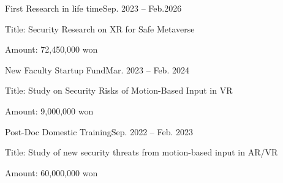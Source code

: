 \documentclass[11pt,letterpaper]{article}
\begin{document}
\begin{envtime}{First Research in life time}{Sep. 2023 -- Feb.2026}
	\item Title: Security Research on XR for Safe Metaverse
	\item Amount: 72,450,000 won
\end{envtime}
\begin{envtime}{New Faculty Startup Fund}{Mar. 2023 -- Feb. 2024}
	\item Title: Study on Security Risks of Motion-Based Input in VR
	\item Amount: 9,000,000 won
\end{envtime}
\begin{envtime}{Post-Doc Domestic Training}{Sep. 2022 -- Feb. 2023}
	\item Title: Study of new security threats from motion-based input in AR/VR
	\item Amount: 60,000,000 won
\end{envtime}



%
\end{document}
